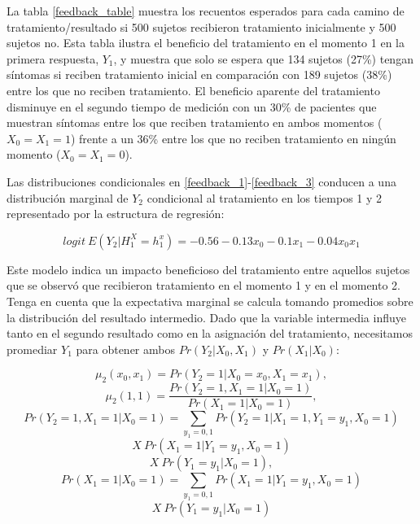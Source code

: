 \documentclass[spanish]{article}
\numberwithin{figure}{subsection}
\numberwithin{equation}{subsection}
\numberwithin{table}{subsection}
\begin{document}
La tabla \ref{feedback_table} muestra los recuentos esperados para cada camino de tratamiento/resultado si 500 sujetos
recibieron tratamiento inicialmente y 500 sujetos no. Esta tabla ilustra el beneficio del tratamiento en el momento 1 en
la primera respuesta, $Y_1$, y muestra que solo se espera que 134 sujetos (27\%) tengan síntomas si reciben tratamiento
inicial en comparación con 189 sujetos (38\%) entre los que no reciben tratamiento. El beneficio aparente del tratamiento
disminuye en el segundo tiempo de medición con un 30\% de pacientes que muestran síntomas entre los que reciben tratamiento
en ambos momentos ($X_0 = X_1 = 1$) frente a un 36\% entre los que no reciben tratamiento en ningún momento ($X_0 = X_1 = 0$).

Las distribuciones condicionales en \ref{feedback_1}-\ref{feedback_3} conducen a una distribución marginal de $Y_2$ condicional
al tratamiento en los tiempos 1 y 2 representado por la estructura de regresión:

\begin{equation}
	\label{feedback_4}
	logit \ E(Y_2|H_1^X = h_1^x) = -0.56 - 0.13x_0 -0.1x_1 - 0.04x_0x_1
\end{equation}

Este modelo indica un impacto beneficioso del tratamiento entre aquellos sujetos que se observó que recibieron tratamiento
en el momento 1 y en el momento 2. Tenga en cuenta que la expectativa marginal se calcula tomando promedios sobre la
distribución del resultado intermedio. Dado que la variable intermedia influye tanto en el segundo resultado como en la
asignación del tratamiento, necesitamos promediar $Y_1$ para obtener ambos $Pr(Y_2|X_0, X_1)$ y $Pr(X_1|X_0)$:

\[ \mu_2(x_0, x_1) = Pr(Y_2 = 1|X_0 = x_0, X_1 = x_1), \]
\[ \mu_2(1, 1) = \frac{Pr(Y_2 = 1, X_1 = 1 | X_0 = 1)}{Pr(X_1 = 1 | X_0 = 1)}, \]
\[ Pr(Y_2 = 1, X_1 = 1 | X_0 = 1) = \sum_{y_1 = 0, 1} Pr(Y_2 = 1 | X_1 = 1, Y_1 = y_1, X_0 = 1) \]
\[ X \ Pr(X_1 = 1 | Y_1 = y_1, X_0 = 1) \]
\[ X \ Pr(Y_1 = y_1 | X_0 = 1), \]
\[ Pr(X_1 = 1 | X_0 = 1) = \sum_{y_1 = 0, 1} Pr(X_1 = 1 | Y_1 = y_1, X_0 = 1) \]
\[ X \ Pr(Y_1 = y_1 | X_0 = 1) \]
\end{document}
